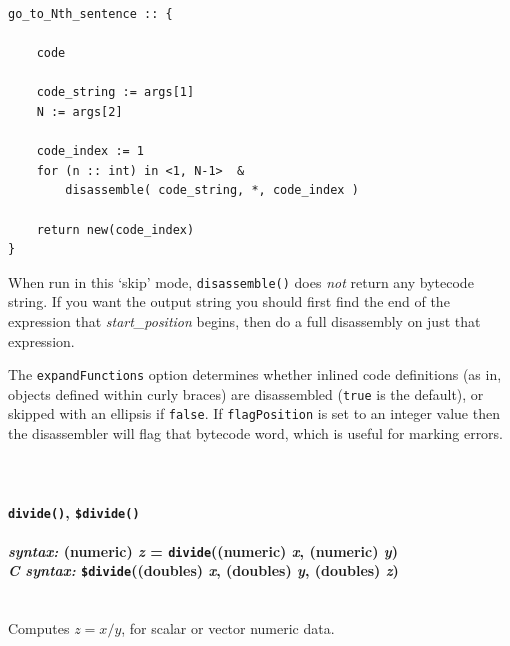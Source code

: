 \documentclass{article}
\newenvironment{code}{
       \begin{list}{}{
               \setlength{\leftmargin}{.4in}
               \setlength{\rightmargin}{0in}
               \setlength{\topsep}{.2in}
       }
       \small
       \item[] }
       { \end{list}   }
\begin{document}
\begin{code} \begin{verbatim}
go_to_Nth_sentence :: {
    
    code
    
    code_string := args[1]
    N := args[2]
    
    code_index := 1
    for (n :: int) in <1, N-1>  &
        disassemble( code_string, *, code_index )
    
    return new(code_index)
}
\end{verbatim} \end{code}

\noindent When run in this `skip' mode, \verb#disassemble()# does \emph{not} return any bytecode string.  If you want the output string you should first find the end of the expression that \emph{start\_position} begins, then do a full disassembly on just that expression.

The \verb#expandFunctions# option determines whether inlined code definitions (as in, objects defined within curly braces) are disassembled (\verb#true# is the default), or skipped with an ellipsis if \verb#false#.  If \verb#flagPosition# is set to an integer value then the disassembler will flag that bytecode word, which is useful for marking errors. \\\\\\




\paragraph{\texttt{divide()}, \texttt{\$divide()}\\\\
\normalfont \emph{syntax: } (numeric) \emph{z} = \texttt{divide}((numeric) \emph{x}, (numeric) \emph{y})\\
\normalfont \emph{C syntax: } \texttt{\$divide}((doubles) \emph{x}, (doubles) \emph{y}, (doubles) \emph{z})\\\\}

Computes $z = x / y$, for scalar or vector numeric data.\\\\
\end{document}
